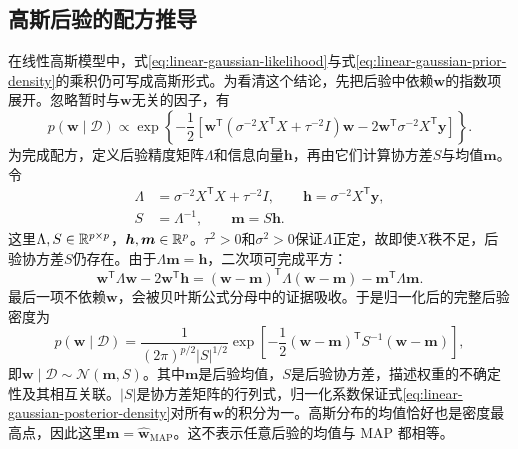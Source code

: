\subsection{高斯后验的配方推导}
在线性高斯模型中，式\eqref{eq:linear-gaussian-likelihood}与式\eqref{eq:linear-gaussian-prior-density}的乘积仍可写成高斯形式。为看清这个结论，先把后验中依赖$\bm w$的指数项展开。忽略暂时与$\bm w$无关的因子，有
\begin{equation}
 p(\bm w\mid\mathcal D)\propto
 \exp\left\{-\frac12\left[
 \bm w^{\mathsf T}(\sigma^{-2}X^{\mathsf T}X+\tau^{-2}I)\bm w
 -2\bm w^{\mathsf T}\sigma^{-2}X^{\mathsf T}\bm y
 \right]\right\}.
\end{equation}
为完成配方，定义后验精度矩阵$\Lambda$和信息向量$\bm h$，再由它们计算协方差$S$与均值$\bm m$。令
\begin{align}
 \Lambda&=\sigma^{-2}X^{\mathsf T}X+\tau^{-2}I,\qquad
 \bm h=\sigma^{-2}X^{\mathsf T}\bm y,\\
 S&=\Lambda^{-1},\qquad \bm m=S\bm h.
\end{align}
这里$\Lambda,S\in\mathbb{R}^{p\times p}$，$\bm h,\bm m\in\mathbb{R}^p$。$\tau^2>0$和$\sigma^2>0$保证$\Lambda$正定，故即使$X$秩不足，后验协方差$S$仍存在。由于$\Lambda\bm m=\bm h$，二次项可完成平方：
\begin{equation}
 \bm w^{\mathsf T}\Lambda\bm w-2\bm w^{\mathsf T}\bm h
 =(\bm w-\bm m)^{\mathsf T}\Lambda(\bm w-\bm m)
 -\bm m^{\mathsf T}\Lambda\bm m.
 \label{eq:linear-posterior-completing-square}
\end{equation}
最后一项不依赖$\bm w$，会被贝叶斯公式分母中的证据吸收。于是归一化后的完整后验密度为
\begin{equation}
 p(\bm w\mid\mathcal D)=
 \frac{1}{(2\pi)^{p/2}|S|^{1/2}}
 \exp\left[-\frac12(\bm w-\bm m)^{\mathsf T}S^{-1}(\bm w-\bm m)\right],
 \label{eq:linear-gaussian-posterior-density}
\end{equation}
即$\bm w\mid\mathcal D\sim\mathcal N(\bm m,S)$。其中$\bm m$是后验均值，$S$是后验协方差，描述权重的不确定性及其相互关联。$|S|$是协方差矩阵的行列式，归一化系数保证式\eqref{eq:linear-gaussian-posterior-density}对所有$\bm w$的积分为一。高斯分布的均值恰好也是密度最高点，因此这里$\bm m=\hat{\bm w}_{\mathrm{MAP}}$。这不表示任意后验的均值与 MAP 都相等。

